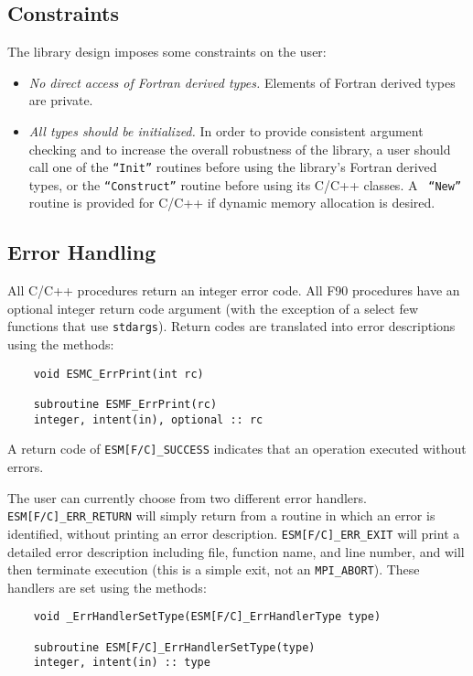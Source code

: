 \subsection{Constraints}

The library design imposes some constraints on the user:

\begin{itemize}
\item {\it No direct access of Fortran derived types.} Elements of
  Fortran derived types are private.
  
\item{\it All types should be initialized.} In order to provide
  consistent argument checking and to increase the overall robustness
  of the library, a user should call one of the {\tt ``Init''}
  routines before using the library's Fortran derived types, or the
  {\tt ``Construct''} routine before using its C/C++ classes.  A {\tt
    ``New''} routine is provided for C/C++ if dynamic memory
  allocation is desired.

\end{itemize}

\subsection{Error Handling}

All C/C++ procedures return an integer error code.  All F90 procedures have 
an optional integer return code argument (with the exception of a select few
functions that use {\tt stdargs}).  Return codes are translated 
into error descriptions using the methods: 

\begin{verbatim}
    void ESMC_ErrPrint(int rc)

    subroutine ESMF_ErrPrint(rc)  
    integer, intent(in), optional :: rc
\end{verbatim}

A return code of {\tt ESM[F/C]\_SUCCESS} indicates that an 
operation executed without errors.

The user can currently choose from two different error handlers.
{\tt ESM[F/C]\_ERR\_RETURN} will simply return from a routine in which an error 
is identified, without printing an error description.
{\tt ESM[F/C]\_ERR\_EXIT} will print a detailed error description including
file, function name, and line number, and will then terminate execution
(this is a simple exit, not an {\tt MPI\_ABORT}).  These handlers are set 
using the methods: 
\begin{verbatim}
    void _ErrHandlerSetType(ESM[F/C]_ErrHandlerType type)

    subroutine ESM[F/C]_ErrHandlerSetType(type)
    integer, intent(in) :: type
\end{verbatim}

